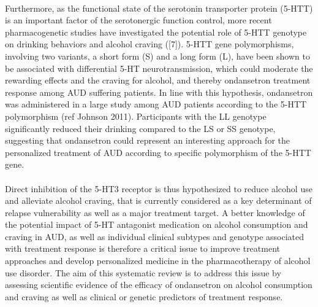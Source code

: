 \paragraph{}Furthermore, as the functional state of the serotonin transporter protein (5-HTT) is an important factor of the serotonergic function control, more recent pharmacogenetic studies have investigated the potential role of 5-HTT genotype on drinking behaviors and alcohol craving ([7]). 5-HTT gene polymorphisms, involving two variants, a short form (S) and a long form (L), have been shown to be associated with differential 5-HT neurotransmission, which could moderate the rewarding effects and the craving for alcohol, and thereby ondansetron treatment response among AUD suffering patients. In line with this hypothesis, ondansetron was administered in a large study among AUD patients according to the 5-HTT polymorphism (ref Johnson 2011). Participants with the LL genotype significantly reduced their drinking compared to the LS or SS genotype, suggesting that ondansetron could represent an interesting approach for the personalized treatment of AUD according to specific polymorphism of the 5-HTT gene.

\paragraph{}Direct inhibition of the 5-HT3 receptor is thus hypothesized to reduce alcohol use and alleviate alcohol craving, that is currently considered as a key determinant of relapse vulnerability as well as a major treatment target. A better knowledge of the potential impact of 5-HT antagonist medication on alcohol consumption and craving in AUD, as well as individual clinical subtypes and genotype associated with treatment response is therefore a critical issue to improve treatment approaches and develop personalized medicine in the pharmacotherapy of alcohol use disorder. The aim of this systematic review is to address this issue by assessing scientific evidence of the efficacy of ondansetron on alcohol consumption and craving as well as clinical or genetic predictors of treatment response.
